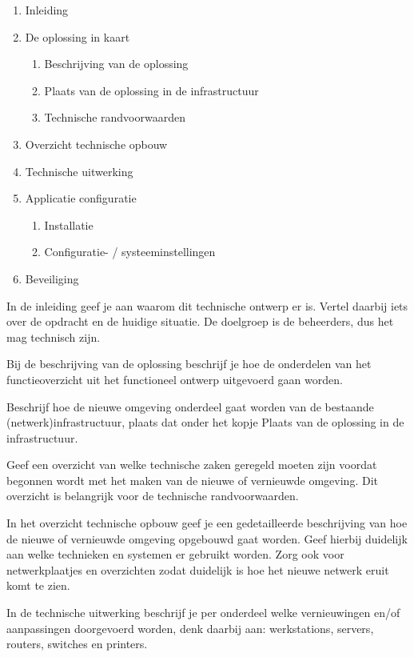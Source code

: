 
\begin{enumerate}
\item Inleiding
\item De oplossing in kaart
	\begin{enumerate}
	\item Beschrijving van de oplossing
	\item Plaats van de oplossing in de infrastructuur
	\item Technische randvoorwaarden
	\end{enumerate}
\item Overzicht technische opbouw
\item Technische uitwerking
\item Applicatie configuratie
	\begin{enumerate}
	\item Installatie
	\item Configuratie- / systeeminstellingen
	\end{enumerate}
\item Beveiliging
\end{enumerate}

In de inleiding geef je aan waarom dit technische ontwerp er is. Vertel daarbij iets over de opdracht en de huidige situatie. De doelgroep is de beheerders, dus het mag technisch zijn.

Bij de beschrijving van de oplossing beschrijf je hoe de onderdelen van het functieoverzicht uit het functioneel ontwerp uitgevoerd gaan worden.

Beschrijf hoe de nieuwe omgeving onderdeel gaat worden van de bestaande (netwerk)infrastructuur, plaats dat onder het kopje Plaats van de oplossing in de infrastructuur.

Geef een overzicht van welke technische zaken geregeld moeten zijn voordat begonnen wordt met het maken van de nieuwe of vernieuwde omgeving. Dit overzicht is belangrijk voor de technische randvoorwaarden.

In het overzicht technische opbouw geef je een gedetailleerde beschrijving van hoe de nieuwe of vernieuwde omgeving opgebouwd gaat worden. Geef hierbij duidelijk aan welke technieken en systemen er gebruikt worden. Zorg ook voor netwerkplaatjes en overzichten zodat duidelijk is hoe het nieuwe netwerk eruit komt te zien.

In de technische uitwerking beschrijf je per onderdeel welke vernieuwingen en/of aanpassingen doorgevoerd worden, denk daarbij aan: werkstations, servers, routers, switches en printers.

